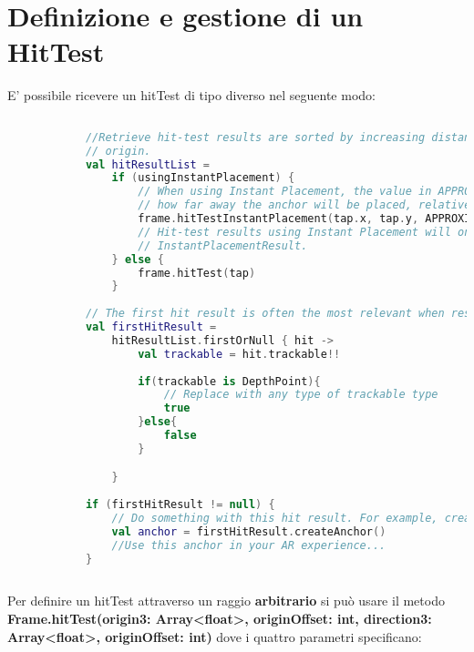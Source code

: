 \documentclass[crop=false, class=book]{standalone}
\begin{document}
	\section{Definizione e gestione di un HitTest}
	E' possibile ricevere un hitTest di tipo diverso nel seguente modo:
	\begin{center}
		\begin{minipage}{1.1\textwidth}
			\begin{lstlisting}[caption={Filtraggio hitTest in base al tipo}, label={lst: hitTest-filter}, language=Kotlin]
			
			//Retrieve hit-test results are sorted by increasing distance from the camera or virtual ray's
			// origin.
			val hitResultList =
  				if (usingInstantPlacement) {
    				// When using Instant Placement, the value in APPROXIMATE DISTANCE METERS will determine
    				// how far away the anchor will be placed, relative to the camera's view.
    				frame.hitTestInstantPlacement(tap.x, tap.y, APPROXIMATE_DISTANCE_METERS)
    				// Hit-test results using Instant Placement will only have one result of type
    				// InstantPlacementResult.
  				} else {
    				frame.hitTest(tap)
  				}
  				
			// The first hit result is often the most relevant when responding to user input.
			val firstHitResult =
  				hitResultList.firstOrNull { hit ->
  					val trackable = hit.trackable!!
  					
  					if(trackable is DepthPoint){
  						// Replace with any type of trackable type
  						true
  					}else{
  						false
  					}

  				}
  				
			if (firstHitResult != null) {
  				// Do something with this hit result. For example, create an anchor at this point of interest.
  				val anchor = firstHitResult.createAnchor()
  				//Use this anchor in your AR experience...
			}
  								
			\end{lstlisting}
		\end{minipage}
	\end{center}
	
	
	\begin{flushleft}
		Per definire un hitTest attraverso un raggio \textbf{arbitrario} si può usare il metodo \textbf{Frame.hitTest(origin3: 			Array<float>, originOffset: int, direction3: Array<float>, originOffset: int)} dove i quattro parametri 						specificano:
	\end{flushleft}
	
\end{document}
